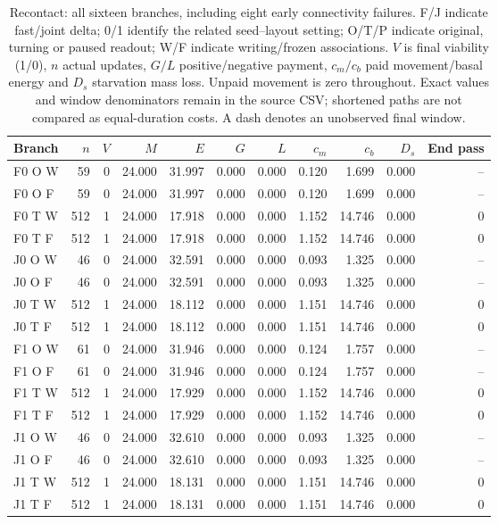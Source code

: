 \begin{table}[htbp]\centering\scriptsize
\caption{Recontact: all sixteen branches, including eight early connectivity failures. F/J indicate fast/joint delta; 0/1 identify the related seed--layout setting; O/T/P indicate original, turning or paused readout; W/F indicate writing/frozen associations. $V$ is final viability (1/0), $n$ actual updates, $G/L$ positive/negative payment, $c_m/c_b$ paid movement/basal energy and $D_s$ starvation mass loss. Unpaid movement is zero throughout. Exact values and window denominators remain in the source CSV; shortened paths are not compared as equal-duration costs. A dash denotes an unobserved final window.}\label{tab:recontact-costs}
\setlength{\tabcolsep}{2.5pt}\begin{tabular}{lrrrrrrrrrr}\toprule
Branch & $n$ & $V$ & $M$ & $E$ & $G$ & $L$ & $c_m$ & $c_b$ & $D_s$ & End pass\\\midrule
F0 O W & 59 & 0 & 24.000 & 31.997 & 0.000 & 0.000 & 0.120 & 1.699 & 0.000 & --\\
F0 O F & 59 & 0 & 24.000 & 31.997 & 0.000 & 0.000 & 0.120 & 1.699 & 0.000 & --\\
F0 T W & 512 & 1 & 24.000 & 17.918 & 0.000 & 0.000 & 1.152 & 14.746 & 0.000 & 0\\
F0 T F & 512 & 1 & 24.000 & 17.918 & 0.000 & 0.000 & 1.152 & 14.746 & 0.000 & 0\\
J0 O W & 46 & 0 & 24.000 & 32.591 & 0.000 & 0.000 & 0.093 & 1.325 & 0.000 & --\\
J0 O F & 46 & 0 & 24.000 & 32.591 & 0.000 & 0.000 & 0.093 & 1.325 & 0.000 & --\\
J0 T W & 512 & 1 & 24.000 & 18.112 & 0.000 & 0.000 & 1.151 & 14.746 & 0.000 & 0\\
J0 T F & 512 & 1 & 24.000 & 18.112 & 0.000 & 0.000 & 1.151 & 14.746 & 0.000 & 0\\
F1 O W & 61 & 0 & 24.000 & 31.946 & 0.000 & 0.000 & 0.124 & 1.757 & 0.000 & --\\
F1 O F & 61 & 0 & 24.000 & 31.946 & 0.000 & 0.000 & 0.124 & 1.757 & 0.000 & --\\
F1 T W & 512 & 1 & 24.000 & 17.929 & 0.000 & 0.000 & 1.152 & 14.746 & 0.000 & 0\\
F1 T F & 512 & 1 & 24.000 & 17.929 & 0.000 & 0.000 & 1.152 & 14.746 & 0.000 & 0\\
J1 O W & 46 & 0 & 24.000 & 32.610 & 0.000 & 0.000 & 0.093 & 1.325 & 0.000 & --\\
J1 O F & 46 & 0 & 24.000 & 32.610 & 0.000 & 0.000 & 0.093 & 1.325 & 0.000 & --\\
J1 T W & 512 & 1 & 24.000 & 18.131 & 0.000 & 0.000 & 1.151 & 14.746 & 0.000 & 0\\
J1 T F & 512 & 1 & 24.000 & 18.131 & 0.000 & 0.000 & 1.151 & 14.746 & 0.000 & 0\\
\bottomrule\end{tabular}\end{table}\FloatBarrier

